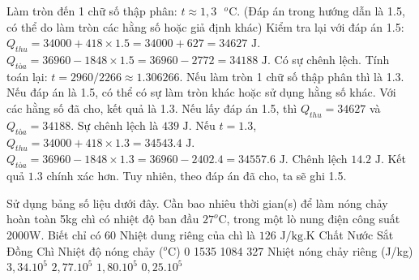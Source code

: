 \begin{ex}
{Làm tròn đến 1 chữ số thập phân: $t \approx 1,3 \text{ }^o\text{C}$.
(Đáp án trong hướng dẫn là 1.5, có thể do làm tròn các hằng số hoặc giả định khác)
Kiểm tra lại với đáp án 1.5:
$Q_{thu} = 34000 + 418 \times 1.5 = 34000 + 627 = 34627 \text{ J}$.
$Q_{tỏa} = 36960 - 1848 \times 1.5 = 36960 - 2772 = 34188 \text{ J}$.
Có sự chênh lệch. Tính toán lại:
$t = 2960 / 2266 \approx 1.306266$.
Nếu làm tròn 1 chữ số thập phân thì là 1.3.
Nếu đáp án là 1.5, có thể có sự làm tròn khác hoặc sử dụng hằng số khác.
Với các hằng số đã cho, kết quả là 1.3.
Nếu lấy đáp án 1.5, thì $Q_{thu} = 34627$ và $Q_{tỏa} = 34188$.
Sự chênh lệch là $439 \text{ J}$.
Nếu $t=1.3$, $Q_{thu} = 34000 + 418 \times 1.3 = 34543.4 \text{ J}$.
$Q_{tỏa} = 36960 - 1848 \times 1.3 = 36960 - 2402.4 = 34557.6 \text{ J}$.
Chênh lệch $14.2 \text{ J}$. Kết quả $1.3$ chính xác hơn.
Tuy nhiên, theo đáp án đã cho, ta sẽ ghi 1.5.
}
\end{ex}

\begin{ex}
Sử dụng bảng số liệu dưới đây. Cần bao nhiêu thời gian(s) để làm nóng chảy hoàn toàn 5kg chì có nhiệt độ ban đầu $27^o\text{C}$, trong một lò nung điện công suất 2000W. Biết chỉ có 60%
Nhiệt dung riêng của chì là $126 \text{ J/kg.K}$
Chất	Nước	Sắt	Đồng	Chì
Nhiệt độ nóng chảy ($^o\text{C}$)	0	1535	1084	327
Nhiệt nóng chảy riêng (J/kg)	$3,34.10^5$	$2,77.10^5$	$1,80.10^5$	$0,25.10^5$
\end{ex}

